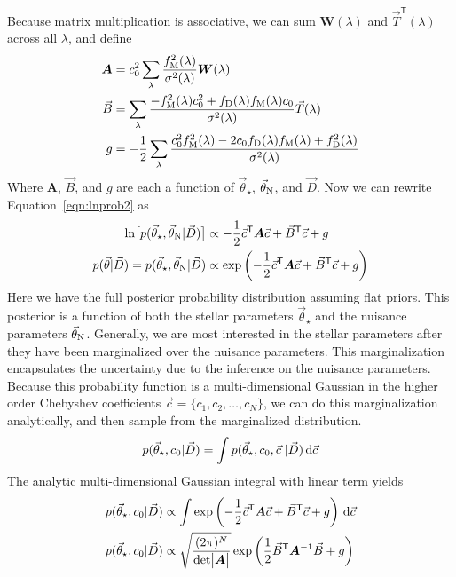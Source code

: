 \documentclass[preprint]{aastex} %
\newcommand{\vt}{\vec{\theta}}
\newcommand{\vstar}{\vt_{\star}}
\newcommand{\vN}{\vt_{\rm N}}
\newcommand{\vc}{\vec{c}}
\newcommand{\fM}{f_{\rm M}}
\newcommand{\fD}{f_{\rm D}}
\newcommand{\vD}{\vec{D}}
\newcommand{\dd}{\,{\rm d}}
\newcommand{\trans}{\mathsf{T}}
\begin{document}
Because matrix multiplication is associative, we can sum ${\bm W(\lambda)}$ and $\vec{T}^\trans(\lambda)$ across all $\lambda$, and define
\begin{align}
  {\bm A} &= c_0^2 \sum_{\lambda} \frac{\fM^2(\lambda)}{\sigma^2(\lambda)} {\bm W}(\lambda) \\
  \vec{B} &= \sum_{\lambda} \frac{-\fM^2(\lambda) c_0^2 + \fD(\lambda) \fM (\lambda) c_0}{\sigma^2(\lambda)} \vec{T}(\lambda)\\
  g &= -\frac{1}{2} \sum_{\lambda} \frac{c_0^2 \fM^2(\lambda) - 2 c_0 \fD(\lambda) \fM(\lambda) + \fD^2(\lambda)}{\sigma^2(\lambda)} 
\end{align}
Where ${\bm A}$, $\vec{B}$, and $g$ are each a function of $\vstar$, $\vN$, and $\vD$. Now we can rewrite Equation~\ref{eqn:lnprob2} as 
\begin{align}
  \ln \bigl [p(\vstar, \vN | \vD) \bigr] &\propto - \frac{1}{2} \vc^\trans {\bm A} \vc + \vec{B}^\trans \vc + g\\
  p(\vt | \vD) = p(\vstar, \vN | \vD) &\propto \exp \left ( - \frac{1}{2} \vc^\trans {\bm A} \vc + \vec{B}^\trans \vc + g \right )
  \label{eqn:lnprob_matrix}
\end{align}
Here we have the full posterior probability distribution assuming flat priors. This posterior is a function of both the stellar parameters $\vstar$ and the nuisance parameters $\vN$. Generally, we are most interested in the stellar parameters after they have been marginalized over the nuisance parameters. This marginalization encapsulates the uncertainty due to the inference on the nuisance parameters. Because this probability function is a multi-dimensional Gaussian in the higher order Chebyshev coefficients $\vc = \{c_1, c_2, \ldots, c_N \}$, we can do this marginalization analytically, and then sample from the marginalized distribution. 
\begin{equation}
  p(\vstar, c_0 | \vD) = \int p(\vstar, c_0, \vc\; | \vD) \dd \vc
\end{equation}
The analytic multi-dimensional Gaussian integral with linear term \citep{sgd+09} yields 
\begin{align}
  p(\vstar, c_0 | \vD) &\propto \int \exp \left ( - \frac{1}{2} \vc^\trans {\bm A} \vc + \vec{B}^\trans \vc + g \right ) \dd \vc\\
  p(\vstar, c_0 | \vD) &\propto \sqrt{\frac{(2 \pi )^N}{ {\rm det} \bigl |{\bm A} \bigr |}} \exp{ \left ( \frac{1}{2} \vec{B}^\trans {\bm A}^{-1} \vec{B} + g \right )}
\end{align}
\end{document}
